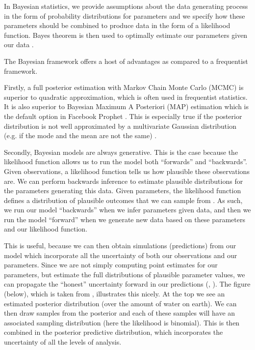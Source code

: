 \documentclass{article}
\begin{document}
In Bayesian statistics, we provide assumptions about the data generating process in the form of probability distributions for parameters and we specify how these parameters should be combined to produce data in the form of a likelihood function. Bayes theorem is then used to optimally estimate our parameters given our data \cite[p.~9]{martin2018bayesian}.

The Bayesian framework offers a host of advantages as compared to a frequentist framework.

Firstly, a full posterior estimation with Markov Chain Monte Carlo (MCMC) is superior to quadratic approximation, which is often used in frequentist statistics. It is also superior to Bayesian Maximum A Posteriori (MAP) estimation which is the default option in Facebook Prophet \cite{taylor2018forecasting}. This is especially true if the posterior distribution is not well approximated by a multivariate Gaussian distribution (e.g. if the mode and the mean are not the same) \cite[p.~325]{McElreath}.

Secondly, Bayesian models are always generative. This is the case because the likelihood function allows us to run the model both “forwards” and “backwards”. Given observations, a likelihood function tells us how plausible these observations are. We can perform backwards inference to estimate plausible distributions for the parameters generating this data.  Given parameters, the likelihood function defines a distribution of plausible outcomes that we can sample from \cite[p.~62]{McElreath}. As such, we run our model “backwards” when we infer parameters given data, and then we run the model “forward” when we generate new data based on these parameters and our likelihood function.

This is useful, because we can then obtain simulations (predictions) from our model which incorporate all the uncertainty of both our observations and our parameters. Since we are not simply computing point estimates for our parameters, but estimate the full distributions of plausible parameter values, we can propagate the “honest” uncertainty forward in our predictions (, ). The figure (below), which is taken from \cite[p.~65]{McElreath}, illustrates this nicely. At the top we see an estimated posterior distribution (over the amount of water on earth). We can then draw samples from the posterior and each of these samples will have an associated sampling distribution (here the likelihood is binomial). This is then combined in the posterior predictive distribution, which incorporates the uncertainty of all the levels of analysis.
\end{document}
